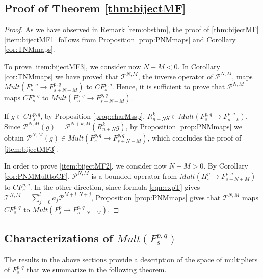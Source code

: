 \documentclass[12pt,twoside,leqno,final]{amsart}
\theoremstyle{plain}
\begin{document}
\subsection{Proof of Theorem \ref{thm:bijectMF}}
\begin{proof}

As we have observed in Remark \ref{rem:obsthm}, the proof of \ref{thm:bijectMF}\eqref{item:bijectMF1}
 follows from Proposition \ref{prop:PNMmaps} and Corollary \ref{cor:TNMmaps}.

To prove \eqref{item:bijectMF3}, we consider now $N-M<0$.
In Corollary \ref{cor:TNMmaps} we have proved that ${{\mathcal T}}^{N,M}$, the inverse operator  of ${{\mathcal P}}^{N,M}$, maps $Mult(F_s^{p,q}\to F_{s+N-M}^{p,q})$ to $CF_s^{p,q}$. Hence, 
it is sufficient to prove that ${{\mathcal P}}^{N,M}$ maps $CF^{p,q}_s$ to 
$Mult(F^{p,q}_s\to F^{p,q}_{s+N-M})$.
 
If $g\in CF^{p,q}_s$, by Proposition \ref{prop:charMssp}, $R^k_{n+N}g\in Mult(F^{p,q}_s\to F^{p,q}_{s-k})$.  Since ${{\mathcal P}}^{N,M}(g)={{\mathcal P}}^{N+k,M}(R^k_{n+N}g)$, 
  by Proposition \ref{prop:PNMmaps} we obtain 
${{\mathcal P}}^{N,M}(g)\in Mult(F^{p,q}_s\to F^{p,q}_{s+N-M})$,
which concludes the proof of \eqref{item:bijectMF3}.

In order to prove \eqref{item:bijectMF2}, we consider now $N-M>0$.  By Corollary \ref{cor:PNMMulttoCF}, ${{\mathcal P}}^{N,M}$ is a bounded operator from  $Mult(H^p_s\to F^{p,q}_{s-N+M})$ to $CF^{p,q}_s$. In the other direction, since formula \eqref{eqn:expT} gives $ {{\mathcal T}}^{N,M}=\sum_{j=0}^{l} a_j {{\mathcal P}}^{M+l,N+j}$, Proposition \ref{prop:PNMmaps} gives that 
 ${{\mathcal T}}^{N,M}$ maps $CF^{p,q}_s$ to $Mult(F^p_s\to F^{p,q}_{s-N+M})$. 
\end{proof}

\subsection{Characterizations of $Mult(F^{p,q}_s)$}

The results in the above sections provide a 
description of the space of multipliers of $F_s^{p,q}$ that we summarize in the following theorem.
\end{document}
